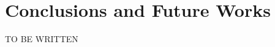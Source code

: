 ﻿\documentclass[ENG]{TFUOC}%
\begin{document}



\chapter{Conclusions and Future Works}

TO BE WRITTEN
\end{document}
